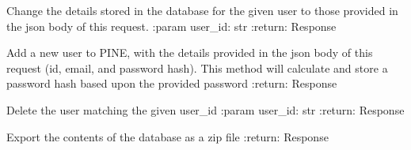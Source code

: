 \documentclass[letterpaper,10pt,english]{sphinxmanual}
\begin{document}

\begin{fulllineitems}
\label{\detokenize{autoapi/pine/backend/admin/bp/index:pine.backend.admin.bp.update_user}}
Change the details stored in the database for the given user to those provided in the json body of this request.
:param user\_id: str
:return: Response

\end{fulllineitems}


\begin{fulllineitems}
\label{\detokenize{autoapi/pine/backend/admin/bp/index:pine.backend.admin.bp.add_user}}
Add a new user to PINE, with the details provided in the json body of this request (id, email, and password hash).
This method will calculate and store a password hash based upon the provided password
:return: Response

\end{fulllineitems}


\begin{fulllineitems}
\label{\detokenize{autoapi/pine/backend/admin/bp/index:pine.backend.admin.bp.delete_user}}
Delete the user matching the given user\_id
:param user\_id: str
:return: Response

\end{fulllineitems}


\begin{fulllineitems}
\label{\detokenize{autoapi/pine/backend/admin/bp/index:pine.backend.admin.bp.system_export}}
Export the contents of the database as a zip file
:return: Response

\end{fulllineitems}
\end{document}
